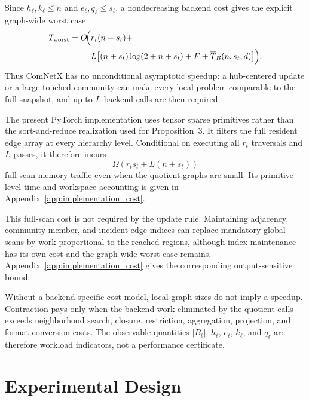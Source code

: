 \documentclass{ieeeaccess}
\begin{document}
Since $h_\ell,k_\ell\le n$ and $e_\ell,q_\ell\le s_t$, a nondecreasing backend
cost gives the explicit graph-wide worst case
\begin{equation}
\begin{aligned}
T_{\mathrm{worst}}=O\!\Bigl(&r_t(n+s_t)+\\
&L\bigl[(n+s_t)\log(2+n+s_t)+F
+\overline T_{\mathcal B}(n,s_t,d)\bigr]\Bigr).
\end{aligned}
\label{eq:graph_wide_worst}
\end{equation}
Thus ComNetX has no unconditional asymptotic speedup: a hub-centered update or
a large touched community can make every local problem comparable to the full
snapshot, and up to $L$ backend calls are then required.

The present PyTorch implementation uses tensor sparse primitives rather than
the sort-and-reduce realization used for Proposition~3. It filters the full
resident edge array at every hierarchy level. Conditional on executing all
$r_t$ traversals and $L$ passes, it therefore incurs
\begin{equation}
\Omega\!\left(r_ts_t+L(n+s_t)\right)
\label{eq:full_scan_lower}
\end{equation}
full-scan memory traffic even when the quotient graphs are small. Its
primitive-level time and workspace accounting is given in
Appendix~\ref{app:implementation_cost}.

This full-scan cost is not required by the update rule. Maintaining adjacency,
community-member, and incident-edge indices can replace mandatory global scans
by work proportional to the reached regions, although index maintenance has its
own cost and the graph-wide worst case remains. Appendix~\ref{app:implementation_cost}
gives the corresponding output-sensitive bound.

Without a backend-specific cost model, local graph sizes do not imply a
speedup. Contraction pays only when the backend work eliminated by the quotient
calls exceeds neighborhood search, closure, restriction, aggregation,
projection, and format-conversion costs. The observable quantities $|B_t|$,
$h_\ell$, $e_\ell$, $k_\ell$, and $q_\ell$ are therefore workload indicators,
not a performance certificate.

\section{Experimental Design}
\label{sec:experiments}
\end{document}
